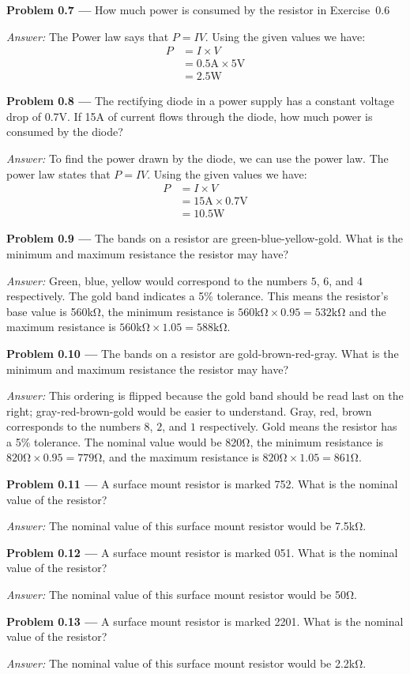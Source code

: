 \documentclass[11pt]{article}
\newcommand{\problem}[1]{\textbf{Problem #1 ---} }
\newcommand{\answer}{\textit{Answer: } }
\begin{document}
\problem{0.7} How much power is consumed by the resistor in
Exercise~0.6

\answer The Power law says that $P = IV$.
Using the given values we have:
\begin{align*}
P &= I\times V\\
  &= 0.5\si{\ampere}\times 5\si{\volt}\\
  &= 2.5\si{\watt}
\end{align*}

\problem{0.8} The rectifying diode in a power supply has a constant
voltage drop of 0.7\si{\volt}.  If 15\si{\ampere} of current flows
through the diode, how much power is consumed by the diode?

\answer To find the power drawn by the diode, we can use the power law.
The power law states that $P = IV$.
Using the given values we have:
\begin{align*}
P &= I\times V\\
  &= 15\si{\ampere}\times 0.7\si{\volt}\\
  &= 10.5\si{\watt}
\end{align*}

\problem{0.9} The bands on a resistor are green-blue-yellow-gold.
What is the minimum and maximum resistance the resistor may have?

\answer Green, blue, yellow would correspond to the numbers $5$, $6$, and $4$ respectively.
The gold band indicates a 5\% tolerance. 
This means the resistor's base value is 560\si{\kilo\ohm}, 
the minimum resistance is $560\si{\kilo\ohm}\times 0.95 = 532\si{\kilo\ohm}$ 
and the maximum resistance is $560\si{\kilo\ohm}\times 1.05 = 588\si{\kilo\ohm}$.

\problem{0.10} The bands on a resistor are gold-brown-red-gray.  What is
the minimum and maximum resistance the resistor may have?

\answer This ordering is flipped because the gold band should be read last on the right;
gray-red-brown-gold would be easier to understand.
Gray, red, brown corresponds to the numbers $8$, $2$, and $1$ respectively.
Gold means the resistor has a 5\% tolerance.
The nominal value would be 820\si{\ohm},
the minimum resistance is $820\si{\ohm}\times 0.95 = 779\si{\ohm}$,
and the maximum resistance is $820\si{\ohm}\times 1.05 = 861\si{\ohm}$.

\problem{0.11} A surface mount resistor is marked 752.  What is the
nominal value of the resistor?

\answer The nominal value of this surface mount resistor would be 7.5\si{\kilo\ohm}.

\problem{0.12} A surface mount resistor is marked 051.  What is the
nominal value of the resistor?

\answer The nominal value of this surface mount resistor would be 50\si{\ohm}.

\problem{0.13} A surface mount resistor is marked 2201.  What is the
nominal value of the resistor?

\answer The nominal value of this surface mount resistor would be 2.2\si{\kilo\ohm}.
\end{document}
